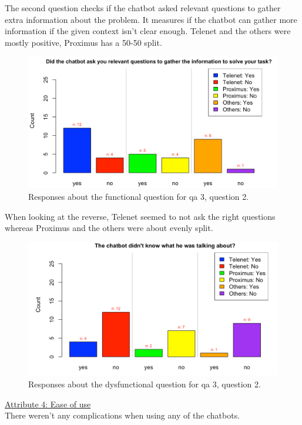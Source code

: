 \break
The second question checks if the chatbot asked relevant questions to gather extra information about the problem. It measures if the chatbot can gather more information if the given context isn't clear enough. Telenet and the others were mostly positive, Proximus has a 50-50 split.\\
\begin{figure}[!htb]
	\includegraphics[width=\linewidth, scale=0.5]{../LaTeX/Figures/Comparative/Q3b.png}
	\caption{Responses about the functional question for \acrshort{qa} 3, question 2.}\label{fig:Q3b}
\end{figure}
When looking at the reverse, Telenet seemed to not ask the right questions whereas Proximus and the others were about evenly split.\\
\begin{figure}[!htb]
	\includegraphics[width=\linewidth, scale=0.5]{../LaTeX/Figures/Comparative/DQ3.png}
	\caption{Responses about the dysfunctional question for \acrshort{qa} 3, question 2.}\label{fig:DQ3}
\end{figure}
\break 
\ul{Attribute 4: Ease of use}\\
\break
There weren't any complications when using any of the chatbots.
